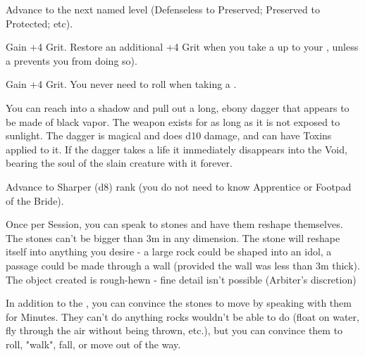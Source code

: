 \begin{multicols*}{2}

Advance   to the next named level (Defenseless to Preserved; Preserved to Protected; etc).


Gain +4 \MAX Grit. Restore an additional +4 Grit when you take a  up to your \MAX, unless a  prevents you from doing so).



Gain +4 \MAX Grit. You never need to roll  when taking a .


You can reach into a shadow and pull out a long, ebony dagger that appears to be made of black vapor. The weapon exists for as long as it is not exposed to sunlight.  The dagger is magical and does d10 damage, and can have Toxins applied to it.  If the dagger takes a life it immediately disappears into the Void, bearing the soul of the slain creature with it forever.


Advance  to Sharper (d8) rank (you do not need to know Apprentice or Footpad of the Bride).

\cbreak


Once per Session, you can speak to stones and have them reshape themselves.  The stones can't be bigger than 3m in any dimension.  The stone will reshape itself into anything you desire - a large rock could be shaped into an idol, a passage could be made through a wall (provided the wall was less than 3m thick).  The object created is rough-hewn - fine detail isn't possible (Arbiter's discretion)



In addition to the , you can convince the stones to move by speaking with them for Minutes. They can't do anything rocks wouldn't be able to do (float on water, fly through the air without being thrown, etc.), but you can convince them to roll, "walk", fall, or move out of the way.


\end{multicols*}
